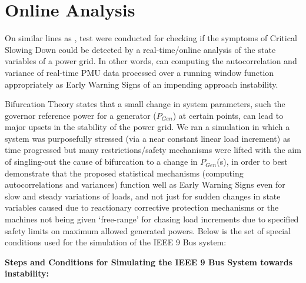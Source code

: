 \section[Online/Real-time Analysis]{Online Analysis}
\label{sec:online}

On similar lines as \cite{ghanvati01, sanchez01}, test were conducted for checking if the symptoms of Critical Slowing Down could  be detected by a real-time/online analysis of the state variables of a power grid. In other words, can computing the autocorrelation and variance of real-time PMU data processed over a running window function appropriately as Early Warning Signs of an impending approach instability.

Bifurcation Theory states that a small change in system parameters, such the governor reference power for a generator ($P_{Gen}$) at certain points, can lead to major upsets in the stability of the power grid. We ran a simulation in which a system was purposefully stressed (via a near constant linear load increment) as time progressed but many restrictions/safety mechanisms were lifted with the aim of singling-out the cause of bifurcation to a change in $P_{Gen}$(s), in order to best demonstrate that the proposed statistical mechanisms (computing autocorrelations and variances) function well as Early Warning Signs even for slow and steady variations of loads, and not just for sudden changes in state variables caused due to reactionary corrective protection mechanisms or the machines not being given `free-range' for chasing load increments due to specified safety limits on maximum allowed generated powers. Below is the set of special conditions used for the simulation of the IEEE 9 Bus system:

\textbf{Steps and Conditions for Simulating the IEEE 9 Bus System towards instability:}

